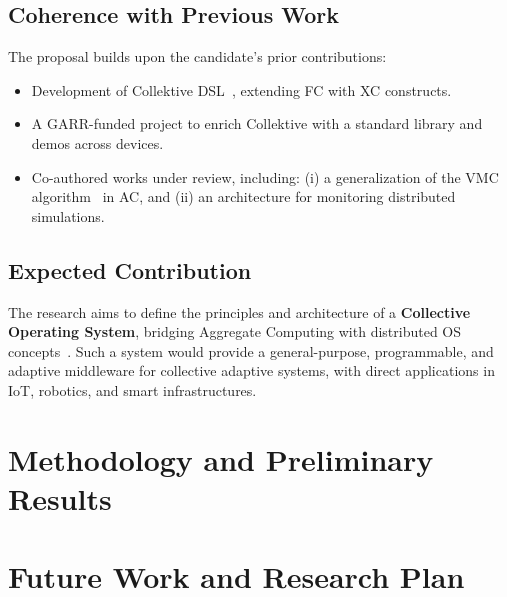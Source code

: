 \documentclass[runningheads]{llncs}
\begin{document}
    \subsection{Coherence with Previous Work}
    The proposal builds upon the candidate’s prior contributions:
    \begin{itemize}
        \item Development of Collektive DSL~\cite{AudritoCDSV24}, extending FC with XC constructs.
        \item A GARR-funded project to enrich Collektive with a standard library and demos across devices.
        \item Co-authored works under review, including: (i) a generalization of the VMC algorithm~\cite{ZahadatHS17} in AC, and (ii) an architecture for monitoring distributed simulations.
    \end{itemize}

    \subsection{Expected Contribution}
    The research aims to define the principles and architecture of a \textbf{Collective Operating System}, bridging Aggregate Computing with distributed OS concepts~\cite{DBLP:journals/csur/TanenbaumR85}.
    Such a system would provide a general-purpose, programmable, and adaptive middleware for collective adaptive systems, with direct applications in IoT, robotics, and smart infrastructures.


    \section{Methodology and Preliminary Results}\label{sec:methodology}


    \section{Future Work and Research Plan}\label{sec:future}
\end{document}
